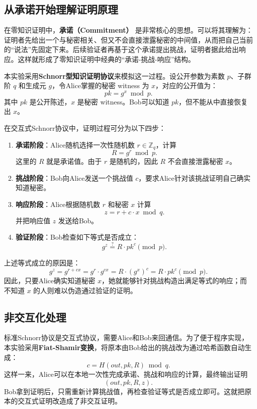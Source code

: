 \documentclass[a4paper]{article}
\begin{document}
\subsection{从承诺开始理解证明原理}
在零知识证明中，\textbf{承诺（Commitment）} 是非常核心的思想。可以将其理解为：证明者先给出一个与秘密相关、但又不会直接泄露秘密的中间值，从而把自己当前的“说法”先固定下来。后续验证者再基于这个承诺提出挑战，证明者据此给出响应。这样就形成了零知识证明中经典的“承诺-挑战-响应”结构。

本实验采用\textbf{Schnorr型知识证明协议}\cite{Schnorr1991}来模拟这一过程。设公开参数为素数 $p$、子群阶 $q$ 和生成元 $g$，令Alice掌握的秘密 witness 为 $x$，对应的公开值为：
\[
pk=g^x \bmod p.
\]
其中 $pk$ 是公开陈述，$x$ 是秘密 witness。Bob可以知道 $pk$，但不能从中直接恢复出 $x$。

在交互式Schnorr协议中，证明过程可分为以下四步：

\begin{enumerate}
    \item \textbf{承诺阶段}：Alice随机选择一次性随机数 $r\in \mathbb{Z}_q$，计算
    \[
    R=g^r \bmod p.
    \]
    这里的 $R$ 就是承诺值。由于 $r$ 是随机的，因此 $R$ 不会直接泄露秘密 $x$。

    \item \textbf{挑战阶段}：Bob向Alice发送一个挑战值 $c$，要求Alice针对该挑战证明自己确实知道秘密。

    \item \textbf{响应阶段}：Alice根据随机数 $r$ 和秘密 $x$ 计算
    \[
    z=r+c\cdot x \bmod q.
    \]
    并把响应值 $z$ 发送给Bob。

    \item \textbf{验证阶段}：Bob检查如下等式是否成立：
    \[
    g^z \stackrel{?}{=} R\cdot pk^c \pmod p.
    \]
\end{enumerate}

上述等式成立的原因是：
\[
g^z=g^{r+cx}=g^r\cdot g^{cx}=R\cdot (g^x)^c=R\cdot pk^c \pmod p.
\]
因此，只要Alice确实知道秘密 $x$，她就能够针对挑战构造出满足等式的响应；而不知道 $x$ 的人则难以伪造通过验证的证明。

\subsection{非交互化处理}
标准Schnorr协议是交互式协议，需要Alice和Bob来回通信。为了便于程序实现，本实验采用\textbf{Fiat-Shamir变换}\cite{FiatShamir1986}，将原本由Bob给出的挑战改为通过哈希函数自动生成：
\[
c = H(out, pk, R)\bmod q.
\]
这样一来，Alice可以在本地一次性完成承诺、挑战和响应的计算，最终输出证明
\[
(out, pk, R, z).
\]
Bob拿到证明后，只需重新计算挑战值，再检查验证等式是否成立即可。这就把原本的交互式证明改造成了非交互证明。
\end{document}
